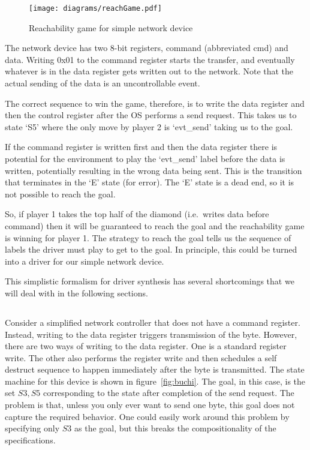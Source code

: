 \begin{figure}
\centering
\texttt{[image: diagrams/reachGame.pdf]}
\caption{Reachability game for simple network device}
\label{fig:reach}
\end{figure}

The network device has two 8-bit registers, command (abbreviated cmd) and data. Writing 0x01 to the command register starts the transfer, and eventually whatever is in the data register gets written out to the network. Note that the actual sending of the data is an uncontrollable event. 

The correct sequence to win the game, therefore, is to write the data register and then the control register after the OS performs a send request. This takes us to state `S5' where the only move by player 2 is `evt\_send' taking us to the goal. 

If the command register is written first and then the data register there is potential for the environment to play the `evt\_send' label before the data is written, potentially resulting in the wrong data being sent. This is the transition that terminates in the `E' state (for error). The `E' state is a dead end, so it is not possible to reach the goal. 

So, if player 1 takes the top half of the diamond (i.e.\ writes data before command) then it will be guaranteed to reach the goal and the reachability game is winning for player 1. The strategy to reach the goal tells us the sequence of labels the driver must play to get to the goal. In principle, this could be turned into a driver for our simple network device.

This simplistic formalism for driver synthesis has several shortcomings that we will deal with in the following sections.

\subsection{\buchi}

Consider a simplified network controller that does not have a command register. Instead, writing to the data register triggers transmission of the byte. However, there are two ways of writing to the data register. One is a standard register write. The other also performs the register write and then schedules a self destruct sequence to happen immediately after the byte is transmitted. The state machine for this device is shown in figure~\ref{fig:buchi}. The goal, in this case, is the set ${S3, S5}$ corresponding to the state after completion of the send request. The problem is that, unless you only ever want to send one byte, this goal does not capture the required behavior. One could easily work around this problem by specifying only ${S3}$ as the goal, but this breaks the compositionality of the specifications.

